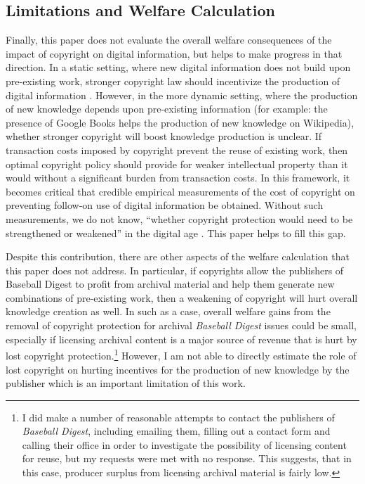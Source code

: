 \documentclass[11pt]{article}
\begin{document}
\subsection{Limitations and Welfare Calculation}


Finally, this paper does not evaluate the overall welfare consequences of the impact of copyright on digital information, but helps to make progress in that direction. In a static setting, where new digital information does not build upon pre-existing work, stronger copyright law should incentivize the production of digital information \citep{watt_copyright_2006}. However, in the more dynamic setting, where the production of new knowledge depends upon pre-existing information \citep{scotchmer_standing_1991} (for example: the presence of Google Books helps the production of new knowledge on Wikipedia), whether stronger copyright will boost knowledge production is unclear. If transaction costs imposed by copyright prevent the reuse of existing work, then optimal copyright policy should provide for weaker intellectual property than it would without a significant burden from transaction costs. In this framework, it becomes critical that credible empirical measurements of the cost of copyright on preventing follow-on use of digital information be obtained. Without such measurements, we do not know, ``whether copyright protection would need to be strengthened or weakened'' in the digital age \citep{waldfogel_copyright_2012}. This paper helps to fill this gap. 

Despite this contribution, there are other aspects of the welfare calculation that this paper does not address. In particular, if copyrights allow the publishers of Baseball Digest to profit from archival material and help them generate new combinations of pre-existing work, then a weakening of copyright will hurt overall knowledge creation as well. In such as a case, overall welfare gains from the removal of copyright protection for archival \emph{Baseball Digest} issues could be small, especially if licensing archival content is a major source of revenue that is hurt by lost copyright protection.\footnote{I did make a number of reasonable attempts to contact the publishers of \emph{Baseball Digest}, including emailing them, filling out a contact form and calling their office in order to investigate the possibility of licensing content for reuse, but my requests were met with no response. This suggests, that in this case, producer surplus from licensing archival material is fairly low.} However, I am not able to directly estimate the role of lost copyright on hurting incentives for the production of new knowledge by the publisher which is an important limitation of this work. 
\end{document}
